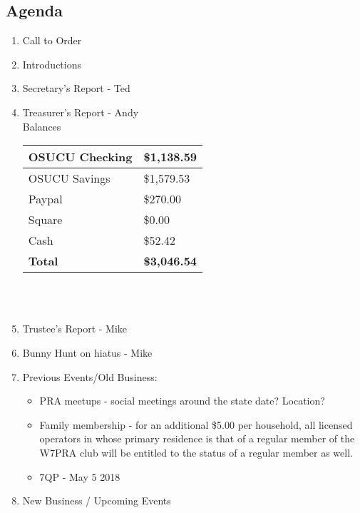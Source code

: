 \documentclass[letter,11pt]{extarticle}
\begin{document}
	\subsection*{Agenda}
	\begin{enumerate}
		\item Call to Order
		\item Introductions
		\item Secretary's Report - Ted
		\item Treasurer's Report - Andy \\
				Balances 
			\begin{tabular}{|l|l|} \hline
				OSUCU Checking & \$1,138.59 \\ \hline
				OSUCU Savings & \$1,579.53 \\ \hline
				Paypal & \$270.00 \\ \hline
				Square & \$0.00 \\ \hline
				Cash & \$52.42 \\ \hline
				\textbf{Total} & \textbf{\$3,046.54} \\ \hline
			\end{tabular} \\ \\
		\item Trustee's Report - Mike
		\item Bunny Hunt on hiatus - Mike
		\item Previous Events/Old Business:
			\begin{itemize}
				\item PRA meetups - social meetings around the state date? Location?
				\item Family membership - for an additional \$5.00 per household, all licensed operators in whose primary residence is that of a regular member of the W7PRA club will be entitled to the status of a regular member as well.
				\item 7QP - May 5 2018
			\end{itemize}
		\item  New Business / Upcoming Events

\end{enumerate}
\end{document}
